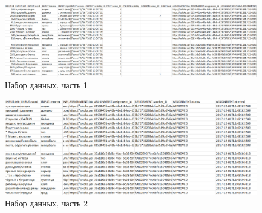 \documentclass[specification,annotation,times]{itmo-student-thesis}
\begin{document}
\begin{figure}
  \includegraphics[width=\linewidth]{dataset1.PNG}
  \caption{Набор данных, часть 1}
  \label{fig:dataset1}
\end{figure}

\begin{figure}
  \includegraphics[width=\linewidth]{dataset2.PNG}
  \caption{Набор данных, часть 2}
  \label{fig:dataset2}
\end{figure}
\end{document}
